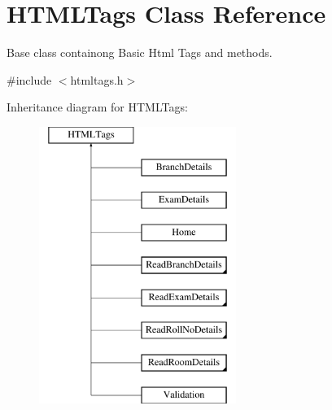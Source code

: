 \hypertarget{classHTMLTags}{\section{H\-T\-M\-L\-Tags Class Reference}
\label{classHTMLTags}
}


Base class containong Basic Html Tags and methods.  




{\ttfamily \#include $<$htmltags.\-h$>$}

Inheritance diagram for H\-T\-M\-L\-Tags\-:\begin{figure}[H]
\begin{center}
\leavevmode
\includegraphics[height=9.000000cm]{classHTMLTags}
\end{center}
\end{figure}
